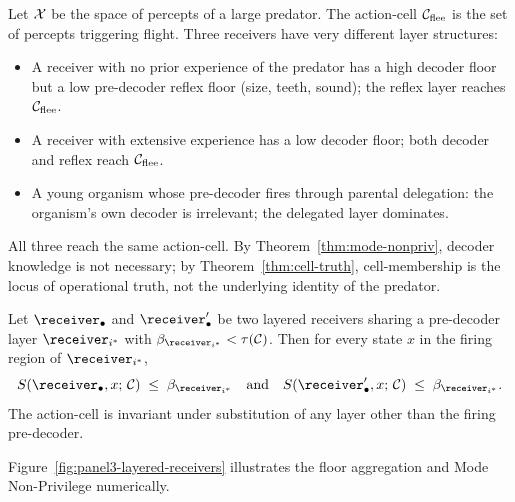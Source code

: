 \begin{example}\label{ex:three-observers}
Let $\mathcal{X}$ be the space of percepts of a large predator. The action-cell $\mathcal{C}_{\text{flee}}$ is the set of percepts triggering flight. Three receivers have very different layer structures:
\begin{itemize}[nosep]
  \item A receiver with no prior experience of the predator has a high decoder floor but a low pre-decoder reflex floor (size, teeth, sound); the reflex layer reaches $\mathcal{C}_{\text{flee}}$.
  \item A receiver with extensive experience has a low decoder floor; both decoder and reflex reach $\mathcal{C}_{\text{flee}}$.
  \item A young organism whose pre-decoder fires through parental delegation: the organism's own decoder is irrelevant; the delegated layer dominates.
\end{itemize}
All three reach the same action-cell. By Theorem~\ref{thm:mode-nonpriv}, decoder knowledge is not necessary; by Theorem~\ref{thm:cell-truth}, cell-membership is the locus of operational truth, not the underlying identity of the predator.
\end{example}

\begin{theorem}\label{thm:cell-closure}
Let $\receiver_\bullet$ and $\receiver'_\bullet$ be two layered receivers sharing a pre-decoder layer $\receiver_{i^*}$ with $\NoiseFloor_{\receiver_{i^*}} < \tau(\Cell)$. Then for every state $x$ in the firing region of $\receiver_{i^*}$,
\[
S(\receiver_\bullet, x;\, \Cell) \;\leq\; \NoiseFloor_{\receiver_{i^*}} \quad \text{and} \quad S(\receiver'_\bullet, x;\, \Cell) \;\leq\; \NoiseFloor_{\receiver_{i^*}}.
\]
The action-cell is invariant under substitution of any layer other than the firing pre-decoder.
\end{theorem}

Figure~\ref{fig:panel3-layered-receivers} illustrates the floor aggregation and Mode Non-Privilege numerically.

